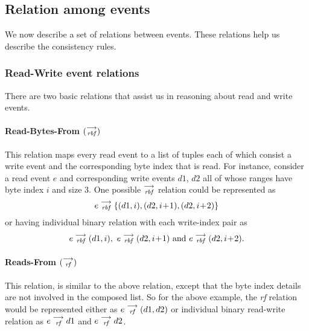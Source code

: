     \subsection{Relation among events}
    
        We now describe a set of relations between events. These relations help us describe the consistency rules.
        
        \subsubsection{Read-Write event relations}
        There are two basic relations that assist us in reasoning about read and write events.
        
            \paragraph{Read-Bytes-From $(\stackrel{\longrightarrow}{_\textit{rbf}})$}
        
            This relation maps every read event to a list of tuples each of which consist a write event and the corresponding byte index that is read. For instance, consider a read event $e$ and corresponding write events $d1$, $d2$ all of whose ranges have byte index $i$ and size 3. One possible $\stackrel{\longrightarrow}{_\textit{rbf}}$ relation could be represented as  
                \[e\stackrel{\longrightarrow}{_{\textit{\textit{rbf}}}}\{(d1, i), (d2, i\!+\!1), (d2, i\!+\!2)\} \]
            or having individual binary relation with each write-index pair as 
                \begin{align*}
                    e\stackrel{\longrightarrow}{_{\textit{rbf}}}(d1, i),\ e\stackrel{\longrightarrow}{_{\textit{rbf}}}(d2, i\!+\!1)  \text{ and } e\stackrel{\longrightarrow}{_{\textit{rbf}}}(d2, i\!+\!2).
                \end{align*}
                
            \paragraph{Reads-From $(\stackrel{\longrightarrow}{_\textit{rf}})$}
            
            This relation, is similar to the above relation, except that the byte index details are not involved in the composed list. So for the above example, the \textit{rf} relation would be represented either as   
                $e\stackrel{\longrightarrow}{_{\textit{rf}}}(d1, d2)$
            or individual binary read-write relation as 
                $e\stackrel{\longrightarrow}{_{\textit{rf}}}d1$ and $e\stackrel{\longrightarrow}{_{\textit{rf}}}d2$.
        
